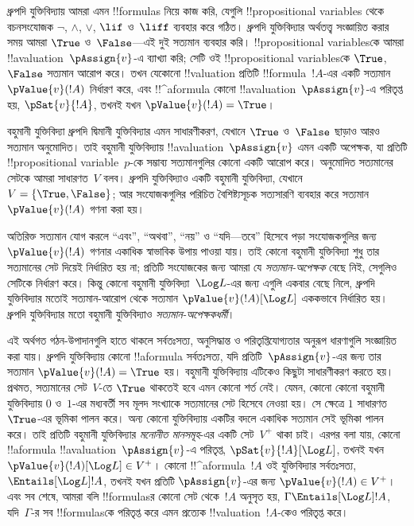 \documentclass[../../../include/open-logic-section]{subfiles}
\begin{document}


ধ্রুপদি যুক্তিবিদ্যায় আমরা এমন !!{formula}s নিয়ে কাজ করি, যেগুলি
!!{propositional variable}s থেকে বচনসংযোজক $\lnot$, $\land$, $\lor$,
$\lif$ ও~$\liff$ ব্যবহার করে গঠিত। ধ্রুপদি যুক্তিবিদ্যার অর্থতত্ত্ব
সংজ্ঞায়িত করার সময় আমরা $\True$ ও~$\False$—এই দুই সত্যমান ব্যবহার করি।
!!{propositional variable}sকে আমরা !!a{valuation}~$\pAssign{v}$-এ
ব্যাখ্যা করি; সেটি ওই !!{propositional variable}sকে $\True$, $\False$
সত্যমান আরোপ করে। তখন যেকোনো !!{valuation} প্রতিটি !!{formula}~$!A$-এর
একটি সত্যমান $\pValue{v}(!A)$ নির্ধারণ করে, এবং !!^a{formula} কোনো
!!a{valuation}~$\pAssign{v}$-এ পরিতৃপ্ত হয়, $\pSat{v}{!A}$, তখনই যখন
$\pValue{v}(!A) = \True$।

বহুমানী যুক্তিবিদ্যা ধ্রুপদি দ্বিমানী যুক্তিবিদ্যার এমন সাধারণীকরণ, যেখানে
$\True$ ও~$\False$ ছাড়াও আরও সত্যমান অনুমোদিত। তাই বহুমানী যুক্তিবিদ্যায়
!!a{valuation}~$\pAssign{v}$ এমন একটি অপেক্ষক, যা প্রতিটি
!!{propositional variable}~$p$-কে সম্ভাব্য সত্যমানগুলির কোনো একটি আরোপ
করে। অনুমোদিত সত্যমানের সেটকে আমরা সাধারণত~$V$ বলব। ধ্রুপদি যুক্তিবিদ্যাও
একটি বহুমানী যুক্তিবিদ্যা, যেখানে $V = \{\True, \False\}$; আর সংযোজকগুলির
পরিচিত বৈশিষ্ট্যসূচক সত্যসারণি ব্যবহার করে সত্যমান~$\pValue{v}(!A)$
গণনা করা হয়।

অতিরিক্ত সত্যমান যোগ করলে “এবং”, “অথবা”, “নয়” ও “যদি---তবে” হিসেবে
পড়া সংযোজকগুলির জন্য $\pValue{v}(!A)$ গণনার একাধিক স্বাভাবিক উপায়
পাওয়া যায়। তাই কোনো বহুমানী যুক্তিবিদ্যা শুধু তার সত্যমানের সেট দিয়েই
নির্ধারিত হয় না; প্রতিটি সংযোজকের জন্য আমরা যে \emph{সত্যমান-অপেক্ষক}
বেছে নিই, সেগুলিও সেটিকে নির্ধারণ করে। কিন্তু কোনো বহুমানী
যুক্তিবিদ্যা~$\Log L$-এর জন্য এগুলি একবার বেছে নিলে, ধ্রুপদি যুক্তিবিদ্যার
মতোই সত্যমান-আরোপ থেকে সত্যমান $\pValue{v}(!A)[\Log L]$ এককভাবে
নির্ধারিত হয়। ধ্রুপদি যুক্তিবিদ্যার মতো বহুমানী যুক্তিবিদ্যাও
\emph{সত্যমান-অপেক্ষকধর্মী}।

এই অর্থগত গঠন-উপাদানগুলি হাতে থাকলে সর্বতঃসত্য, অনুসিদ্ধান্ত ও
পরিতৃপ্তিযোগ্যতার অনুরূপ ধারণাগুলি সংজ্ঞায়িত করা যায়। ধ্রুপদি
যুক্তিবিদ্যায় কোনো !!a{formula} সর্বতঃসত্য, যদি প্রতিটি~$\pAssign{v}$-এর
জন্য তার সত্যমান $\pValue{v}(!A) = \True$ হয়। বহুমানী যুক্তিবিদ্যায়
এটিকেও কিছুটা সাধারণীকরণ করতে হয়। প্রথমত, সত্যমানের সেট~$V$-তে
$\True$ থাকতেই হবে এমন কোনো শর্ত নেই। যেমন, কোনো কোনো বহুমানী
যুক্তিবিদ্যায় $0$ ও~$1$-এর মধ্যবর্তী সব মূলদ সংখ্যাকে সত্যমানের সেট
হিসেবে নেওয়া হয়। সে ক্ষেত্রে $1$ সাধারণত~$\True$-এর ভূমিকা পালন করে।
অন্য কোনো যুক্তিবিদ্যায় একটির বদলে একাধিক সত্যমান সেই ভূমিকা পালন করে।
তাই প্রতিটি বহুমানী যুক্তিবিদ্যার \emph{মনোনীত মানসমূহ}-এর একটি
সেট~$V^+$ থাকা চাই। এরপর বলা যায়, কোনো !!a{formula}
!!a{valuation}~$\pAssign{v}$-এ পরিতৃপ্ত, $\pSat{v}{!A}[\Log L]$, তখনই
যখন $\pValue{v}(!A)[\Log L] \in V^+$। কোনো !!^a{formula}~$!A$ ওই
যুক্তিবিদ্যার সর্বতঃসত্য, $\Entails[\Log L] !A$, তখনই যখন প্রতিটি
$\pAssign{v}$-এর জন্য $\pValue{v}(!A) \in V^+$। এবং সব শেষে, আমরা বলি
!!{formula}sর কোনো সেট থেকে~$!A$ অনুসৃত হয়,
$\Gamma \Entails[\Log L] !A$, যদি~$\Gamma$-র সব !!{formula}sকে
পরিতৃপ্ত করে এমন প্রত্যেক !!{valuation}~$!A$-কেও পরিতৃপ্ত করে।
\end{document}
